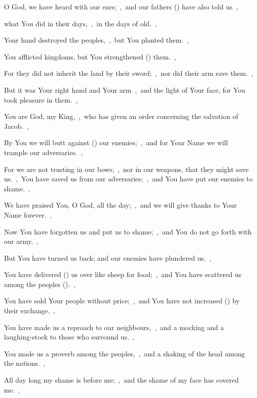 \documentclass[12pt,twoside,a5paper]{article}
\begin{document}
\begin{normalparskip}
  O God, we have heard with our ears;~\sep\ and our fathers () have also told us~\sep


  what You did in their days,~\sep\ in the days of old.~\sep

  Your hand destroyed the peoples,~\sep\ but You planted them.~\sep

  You afflicted kingdoms, but You strengthened () them.~\sep

  For they did not inherit the land by their sword;~\sep\ nor did their arm save them.~\sep

  But it was Your right hand and Your arm~\sep\ and the light of Your face, for You took pleasure in them.~\sep

  You are God, my King,~\sep\ who has given an order concerning the salvation of Jacob.~\sep

  By You we will butt against () our enemies;~\sep\ and for Your Name we will trample our adversaries.~\sep

  For we are not trusting in our bows;~\sep\ nor in our weapons, that they might save us.~\sep\ You have saved us from our adversaries;~\sep\ and You have put our enemies to shame.~\sep

  We have praised You, O God, all the day;~\sep\ and we will give thanks to Your Name forever.~\sep

  Now You have forgotten us and put us to shame;~\sep\ and You do not go forth with our army.~\sep

  But You have turned us back; and our enemies have plundered us.~\sep

  You have delivered () us over like sheep for food;~\sep\ and You have scattered us among the peoples ().~\sep

  You have sold Your people without price;~\sep\ and You have not increased () by their exchange.~\sep

  You have made us a reproach to our neighbours,~\sep\ and a mocking and a laughing-stock to those who surround us.~\sep

  You made us a proverb among the peoples,~\sep\ and a shaking of the head among the nations.~\sep

  All day long my shame is before me;~\sep\ and the shame of my face has covered me.~\sep


\end{normalparskip}
\end{document}
